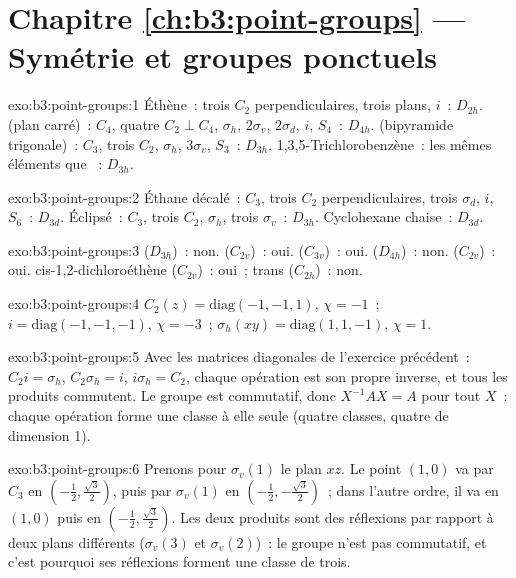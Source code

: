 \section*{Chapitre \ref{ch:b3:point-groups} --- Symétrie et groupes ponctuels}

\begin{solution}{exo:b3:point-groups:1}
Éthène~: trois $C_2$ perpendiculaires, trois plans, $i$~: $D_{2h}$.  (plan
carré)~: $C_4$, quatre $C_2 \perp C_4$, $\sigma_h$, $2\sigma_v$, $2\sigma_d$, $i$, $S_4$~:
$D_{4h}$.  (bipyramide trigonale)~: $C_3$, trois $C_2$, $\sigma_h$, $3\sigma_v$,
$S_3$~: $D_{3h}$. 1,3,5-Trichlorobenzène~: les mêmes éléments que ~: $D_{3h}$.
\end{solution}

\begin{solution}{exo:b3:point-groups:2}
Éthane décalé~: $C_3$, trois $C_2$ perpendiculaires, trois $\sigma_d$, $i$, $S_6$~:
$D_{3d}$. Éclipsé~: $C_3$, trois $C_2$, $\sigma_h$, trois $\sigma_v$~: $D_{3h}$.
Cyclohexane chaise~: $D_{3d}$.
\end{solution}

\begin{solution}{exo:b3:point-groups:3}
 ($D_{3h}$)~: non.  ($C_{2v}$)~: oui.  ($C_{3v}$)~: oui.
 ($D_{4h}$)~: non.  ($C_{2v}$)~: oui. cis-1,2-dichloroéthène
($C_{2v}$)~: oui~; trans ($C_{2h}$)~: non.
\end{solution}

\begin{solution}{exo:b3:point-groups:4}
$C_2(z) = \mathrm{diag}(-1,-1,1)$, $\chi = -1$~; $i = \mathrm{diag}(-1,-1,-1)$,
$\chi = -3$~; $\sigma_h(xy) = \mathrm{diag}(1,1,-1)$, $\chi = 1$.
\end{solution}

\begin{solution}{exo:b3:point-groups:5}
Avec les matrices diagonales de l'exercice précédent~: $C_2i = \sigma_h$, $C_2\sigma_h =
i$, $i\sigma_h = C_2$, chaque opération est son propre inverse, et tous
les produits commutent. Le groupe est commutatif, donc $X^{-1}AX = A$ pour
tout $X$~: chaque opération forme une classe à elle seule (quatre
classes, quatre  de dimension 1).
\end{solution}

\begin{solution}{exo:b3:point-groups:6}
Prenons pour $\sigma_v(1)$ le plan $xz$. Le point $(1,0)$ va par $C_3$ en $(-\frac12,
\frac{\sqrt3}2)$, puis par $\sigma_v(1)$ en $(-\frac12,-\frac{\sqrt3}2)$~;
dans l'autre ordre, il va en $(1,0)$ puis en $(-\frac12,\frac{\sqrt3}2)$.
Les deux produits sont des réflexions par rapport à deux plans différents
($\sigma_v(3)$ et $\sigma_v(2)$)~: le groupe n'est pas commutatif, et
c'est pourquoi ses réflexions forment une classe de trois.
\end{solution}

